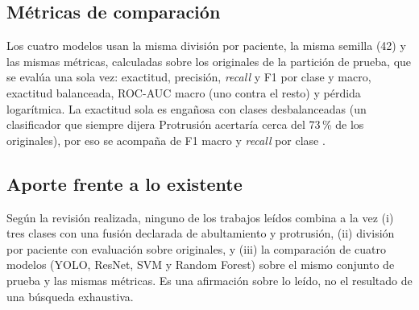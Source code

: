 \subsection{Métricas de comparación}
Los cuatro modelos usan la misma división por paciente, la misma semilla (42) y las mismas métricas, calculadas sobre los originales de la partición de prueba, que se evalúa una sola vez: exactitud, precisión, \emph{recall} y F1 por clase y macro, exactitud balanceada, ROC-AUC macro (uno contra el resto) y pérdida logarítmica. La exactitud sola es engañosa con clases desbalanceadas (un clasificador que siempre dijera Protrusión acertaría cerca del 73\,\% de los originales), por eso se acompaña de F1 macro y \emph{recall} por clase \cite{alkubaisi2022}.

\subsection{Aporte frente a lo existente}
Según la revisión realizada, ninguno de los trabajos leídos combina a la vez (i) tres clases con una fusión declarada de abultamiento y protrusión, (ii) división por paciente con evaluación sobre originales, y (iii) la comparación de cuatro modelos (YOLO, ResNet, SVM y Random Forest) sobre el mismo conjunto de prueba y las mismas métricas. Es una afirmación sobre lo leído, no el resultado de una búsqueda exhaustiva.
